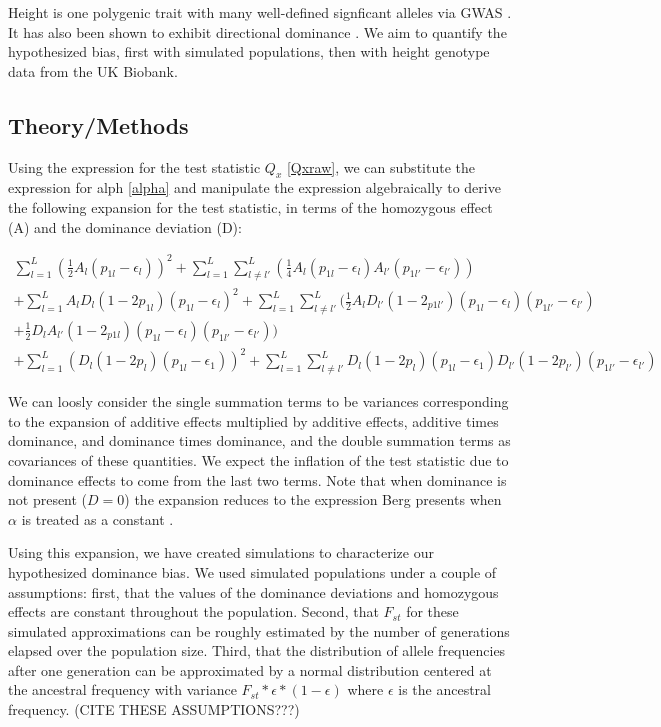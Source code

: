 \documentclass[a4paper,11pt]{article}
\begin{document}
Height is one polygenic trait with many well-defined signficant
alleles via GWAS \cite{heightselection}. It has also been shown to exhibit
directional dominance \cite{heightdirectdom}. We aim to quantify the
hypothesized bias, first with simulated populations, then with height genotype data from the UK Biobank.



\subsection*{Theory/Methods}

Using the expression for the test statistic $Q_x$ \eqref{Qxraw}, we
can substitute the expression for alph \eqref{alpha} and manipulate
the expression algebraically to derive the following expansion for the
test statistic, in terms of the homozygous effect (A)  and the dominance
deviation (D):

\begin{equation}
  \begin{split}
  \sum^L_{l=1}( \frac{1}{2}A_l(p_{1l}-\epsilon_l))^2+\sum^L_{l=1}\sum^L_{
    l \neq l'}(\frac{1}{4}A_l(p_{1l}-\epsilon_{l})A_{l'}(p_{1l'}-\epsilon_{l'}))
  \\
  +\sum^L_{l=1}A_lD_l(1-2p_{1l})(p_{1l}-\epsilon_l)^2 +
  \sum^L_{l=1}\sum^L_{l \neq
    l'}(\frac{1}{2}A_lD_{l'}(1-2_{p1l'})(p_{1l}-\epsilon_l)(p_{1l'}-\epsilon_{l'}) \\
  + \frac{1}{2}D_lA_{l'}(1-2_{p1l})(p_{1l}-\epsilon_l)(p_{1l'}-\epsilon_{l'})) \\
   + \sum^L_{l=1} (D_l(1-2p_l)(p_{1l}-\epsilon_{1}))^2
   + \sum^L_{l=1}\sum^L_{l \neq
     l'}D_{l}(1-2p_{l})(p_{1l}-\epsilon_{1})D_{l'}(1-2p_{l'})(p_{1l'}-\epsilon_{l'}) \label{expansion}
  \end{split}
\end{equation}

We can loosly consider the single summation terms to be variances
corresponding to the expansion of additive effects multiplied by
additive effects, additive times dominance, and dominance times
dominance, and the double summation terms as covariances of these
quantities. We expect the inflation of the test statistic due to
dominance effects to come from the last two terms. Note that when
dominance is not present ($D=0$) the expansion reduces to the
expression Berg presents when $\alpha$ is treated as a constant
\cite{berg}.

Using this expansion, we have created simulations to characterize our
hypothesized dominance bias. We used simulated populations
under a couple of assumptions: first, that the values of the dominance
deviations and homozygous effects are constant throughout the
population. Second, that $F_{st}$ for these simulated approximations
can be roughly estimated by the number of generations elapsed over the
population size. Third, that the distribution of allele frequencies after
one generation can be approximated by a normal distribution centered
at the ancestral frequency with variance
$F_{st}*\epsilon*(1-\epsilon)$ where $\epsilon$ is the ancestral
frequency. (CITE THESE ASSUMPTIONS???)
\end{document}
